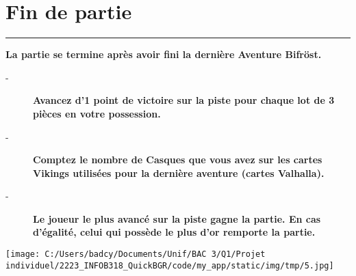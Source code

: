 \documentclass{scrartcl}%
\begin{document}
%
\section{ Fin de partie
}%
\label{sec:Findepartie}%
\rule{18cm}{0.07cm}\break%
\textbf{La partie se termine après avoir fini la dernière Aventure Bifröst.}%

%
\begin{description}%
\item[{-} ]%
%
\textbf{Avancez d'1 point de victoire sur la piste pour chaque lot de 3 pièces en votre possession.}%

%
\item[{-} ]%
%
\textbf{Comptez le nombre de Casques que vous avez sur les cartes Vikings utilisées pour la dernière aventure (cartes Valhalla).}%

%
\item[{-} ]%
%
\textbf{Le joueur le plus avancé sur la piste gagne la partie. En cas d'égalité, celui qui possède le plus d'or remporte la partie.}%

%
\end{description}%
%
\begin{center}\texttt{[image: C:/Users/badcy/Documents/Unif/BAC 3/Q1/Projet individuel/2223\_INFOB318\_QuickBGR/code/my\_app/static/img/tmp/5.jpg]}\end{center}%

%
\end{document}

